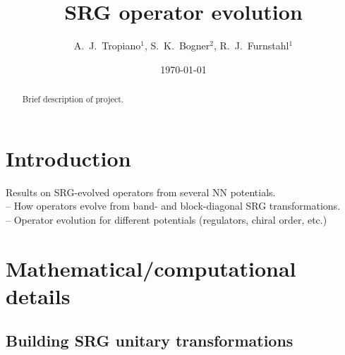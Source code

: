 \documentclass[preprintnumbers,floatfix,aps,prc,preprint,nofootinbib]{revtex4-1}
\begin{document}
\title{SRG operator evolution}


\author{A.~J.~Tropiano$^{1}$, S.~K.~Bogner$^{2}$, R.~J.~Furnstahl$^{1}$}


\date{\today}

\begin{abstract}

Brief description of project.

\end{abstract}


\maketitle

\tableofcontents

\newpage


\section{Introduction}
\label{sec:intro}


Results on SRG-evolved operators from several NN potentials.
\\
-- How operators evolve from band- and block-diagonal SRG transformations.
\\
-- Operator evolution for different potentials (regulators, chiral order, etc.)


\section{Mathematical/computational details}
\label{sec:math_comp_details}


\subsection{Building SRG unitary transformations}
\label{sec:srg_unitary_transformations}
\end{document}
